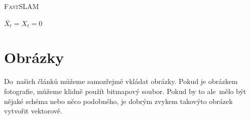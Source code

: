 \documentclass[a4paper, 11pt]{article}
\begin{document}
\bigskip
\begin{algorithm2e}
	\caption{\textsc{FastSLAM}}
	\label{alg:fslam}

	\LinesNumbered
	\SetInd{1em}{1em}
	\SetNlSty{}{}{:}
	\SetNlSkip{-1.2em}
	\DontPrintSemicolon


	\Indentp{1.66em}
	\BlankLine

	$\overline{X_t} = X_t = 0$ \;
\end{algorithm2e}

\section{Obrázky}

Do~našich článků můžeme samozřejmě vkládat obrázky. Pokud je obrázkem
fotografie, můžeme klidně použít bitmapový soubor. Pokud by to ale~mělo
být nějaké schéma nebo něco podobného, je dobrým zvykem takovýto obrázek
vytvořit vektorově.
\end{document}
